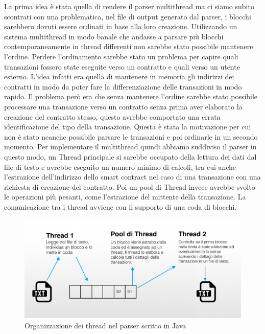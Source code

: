 \documentclass[12pt]{report}
\begin{document}
La prima idea è stata quella di rendere il parser multithread ma ci siamo subito scontrati con una problematica, nel file di output generato dal parser, i blocchi sarebbero dovuti essere ordinati in base alla loro creazione. Utilizzando un sistema multithread in modo banale che andasse a parsare più blocchi contemporaneamente in thread differenti non sarebbe stato possibile mantenere l'ordine.
Perdere l'ordinamento sarebbe stato un problema per capire quali transazioni fossero state eseguite verso un contratto e quali verso un utente esterno. L'idea infatti era quella di mantenere in memoria gli indirizzi dei contratti in modo da poter fare la differenziazione delle transazioni in modo rapido. Il problema però era che senza mantenere l'ordine sarebbe stato possibile processare una transazione verso un contratto senza prima aver elaborato la creazione del contratto stesso, questo avrebbe comportato una errata identificazione del tipo della transazione.
Questa è stata la motivazione per cui non è stato neanche possibile parsare le transazioni e poi ordinarle in un secondo momento.
\newline
Per implementare il multithread quindi abbiamo suddiviso il parser in questo modo, un Thread principale si sarebbe occupato della lettura dei dati dal file di testo e avrebbe eseguito un numero minimo di calcoli, tra cui anche l'estrazione dell'indirizzo dello smart contract nel caso di una transazione con una richiesta di creazione del contratto.
Poi un pool di Thread invece avrebbe svolto le operazioni più pesanti, come l'estrazione del mittente della transazione.
La comunicazione tra i thread avviene con il supporto di una coda di blocchi.

\begin{figure}[H]
    \includegraphics[width=\textwidth]{Thread.jpg}
    \caption{Organizzazione dei thread nel parser scritto in Java}
\end{figure}
\end{document}

